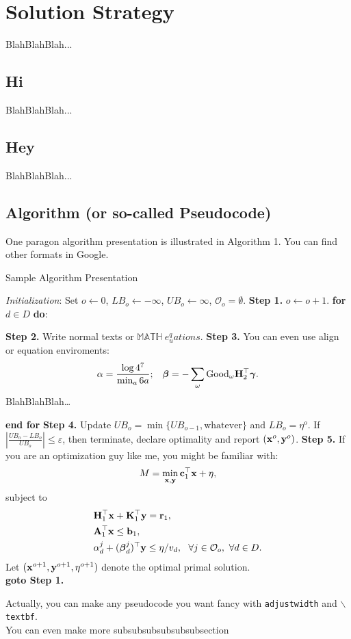 \documentclass[journal]{IEEEtran}
\begin{document}
\section{Solution Strategy}
BlahBlahBlah...
\subsection{Hi}
BlahBlahBlah...
\subsection{Hey}
BlahBlahBlah...
\subsection{Algorithm (or so-called Pseudocode)}
One paragon algorithm presentation is illustrated in Algorithm 1. You can find other formats in Google.
\begin{algorithm}[H]
	\caption{Sample Algorithm Presentation}\label{alg:SAP}
	\begin{algorithmic}
		\State \emph{Initialization}: Set $o\leftarrow0$, $LB_o\leftarrow-\infty$, $UB_o\leftarrow \infty$, $\mathcal{O}_o=\emptyset$. 
		\State \textbf{Step 1.} $o\leftarrow o+1$. 
		\State \textbf{for} $d\in D$ \textbf{do}:
		\begin{adjustwidth}{0.5cm}{}
		\textbf{Step 2.} Write normal texts or $\mathbb{MATH} \ e^q_uations$.
		\State \textbf{Step 3.} You can even use align or equation enviroments:
\begin{align*}
& \alpha = \frac{\log 4^7}{\min_a 6a}; & \boldsymbol{\beta} = -\sum_{\omega}\text{Good}_{\omega}\bold{H}_2^\top\boldsymbol{\gamma}.
\end{align*}
BlahBlahBlah\dots \end{adjustwidth}
\textbf{end for}
		\State \textbf{Step 4.} Update $UB_o = \min\{UB_{o-1}, \text{whatever}\}$ and $LB_o = \eta^o$. If $\left|\frac{UB_o-LB_o}{UB_o}\right|\leq\varepsilon$, then terminate, declare optimality and report $(\bold{x}^{o}, \bold{y}^{o})$.
		\State \textbf{Step 5.} If you are an optimization guy like me, you might be familiar with:
\begin{align*}
M = \min_{\bold{x}, \bold{y}} \bold{c}_1^\top \bold{x}+\eta, 
\end{align*}
subject to
\begin{align*}
& \bold{H}_1^\top\bold{x}+\bold{K}_1^\top\bold{y}= \bold{r}_1, \\
& \bold{A}_1^\top\bold{x}\leq \bold{b}_1, \\
& \alpha_d^j+(\boldsymbol{\beta}_d^j)^\top\bold{y}\leq \eta/v_d, \ \ \forall j\in \mathcal{O}_o, \ \forall d\in D.
\end{align*}
Let $(\bold{x}^{o+1}, \bold{y}^{o+1}, \eta^{o+1})$ denote the optimal primal solution.\\
\textbf{goto Step 1.} 
	\end{algorithmic}
\end{algorithm}
Actually, you can make any pseudocode you want fancy with \texttt{adjustwidth} and \texttt{$\backslash$textbf}.\\
\indent You can even make more subsubsubsubsubsubsection
\end{document}
